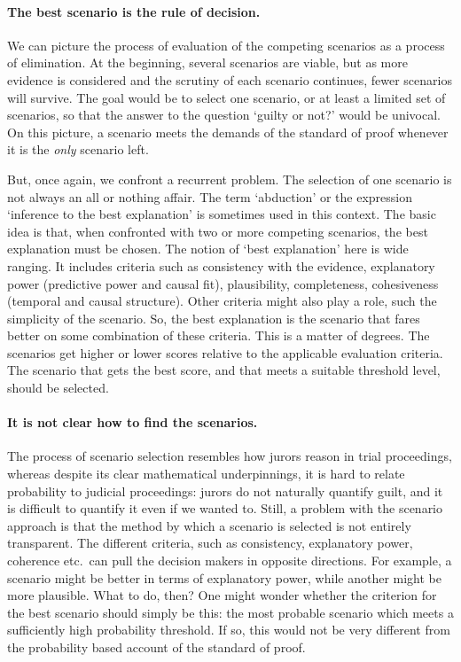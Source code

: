 \documentclass[10pt]{article}
\begin{document}
\paragraph{The best scenario is the rule of decision.}

We can picture the process of evaluation of the competing scenarios as a process of elimination. 
At the beginning, several scenarios are viable, but as more evidence is considered and the scrutiny of each scenario continues,
fewer scenarios will survive. The goal would be to select one scenario, or at least a limited set of scenarios, so that 
the answer to the question `guilty or not?' would be univocal. On this picture, a scenario meets the demands of the standard 
of proof whenever it is the \textit{only} scenario left.

But, once again, we confront a recurrent problem. The selection of one scenario is not always an all or nothing affair.
The term `abduction' or the expression `inference to the best explanation' is sometimes used in this context. The basic idea is that, when confronted 
with two or more competing scenarios, the best explanation must be chosen. The notion of `best explanation' here is wide ranging. It includes criteria such as 
consistency with the evidence, explanatory power (predictive power and causal fit), plausibility, completeness, cohesiveness (temporal and causal structure). 
Other criteria might also play a role, such the simplicity of the scenario.  So, the best explanation is the scenario that fares 
better on some combination of these criteria. This is a matter of degrees. The scenarios get higher 
or lower scores relative to the applicable evaluation criteria. The scenario that gets the best score, and that 
meets a suitable threshold level, should be selected. 





\paragraph{It is not clear how to find the scenarios.}

The process of scenario selection resembles how jurors reason in trial proceedings, whereas despite its 
clear mathematical underpinnings, it is hard to relate probability to judicial proceedings: jurors do not 
naturally quantify guilt, and it is difficult to quantify it even if we wanted to. Still, a problem with the scenario approach is that 
the method by which a scenario is selected is not entirely transparent. The different criteria, such as consistency, explanatory power, coherence etc.\ 
can pull the decision makers in opposite directions. For example, a scenario might be better in terms of explanatory power, while another might 
be more plausible. What to do, then? One might wonder whether the criterion for the best scenario should simply be this:
the most probable scenario which meets a sufficiently high probability threshold. If so, this would not be very 
different from the probability based account of the standard of proof. 
\end{document}
